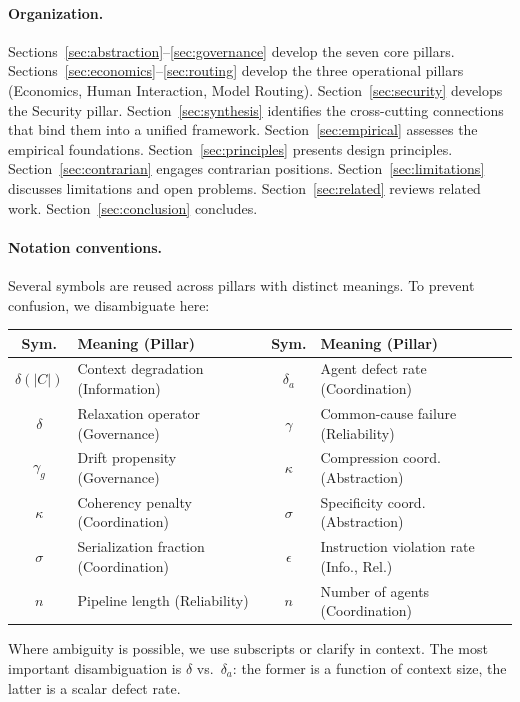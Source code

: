 \documentclass[11pt, a4paper]{googledeepmind}
\begin{document}
\paragraph{Organization.} Sections~\ref{sec:abstraction}--\ref{sec:governance} develop the seven core pillars. Sections~\ref{sec:economics}--\ref{sec:routing} develop the three operational pillars (Economics, Human Interaction, Model Routing). Section~\ref{sec:security} develops the Security pillar. Section~\ref{sec:synthesis} identifies the cross-cutting connections that bind them into a unified framework. Section~\ref{sec:empirical} assesses the empirical foundations. Section~\ref{sec:principles} presents design principles. Section~\ref{sec:contrarian} engages contrarian positions. Section~\ref{sec:limitations} discusses limitations and open problems. Section~\ref{sec:related} reviews related work. Section~\ref{sec:conclusion} concludes.

\paragraph{Notation conventions.} Several symbols are reused across pillars with distinct meanings. To prevent confusion, we disambiguate here:

\begin{center}
\footnotesize
\begin{tabular}{cp{5.5cm}cp{5.5cm}}
\toprule
\textbf{Sym.} & \textbf{Meaning (Pillar)} & \textbf{Sym.} & \textbf{Meaning (Pillar)} \\
\midrule
$\delta(|C|)$ & Context degradation (Information) & $\delta_a$ & Agent defect rate (Coordination) \\
$\delta$ & Relaxation operator (Governance) & $\gamma$ & Common-cause failure (Reliability) \\
$\gamma_g$ & Drift propensity (Governance) & $\kappa$ & Compression coord. (Abstraction) \\
$\kappa$ & Coherency penalty (Coordination) & $\sigma$ & Specificity coord. (Abstraction) \\
$\sigma$ & Serialization fraction (Coordination) & $\epsilon$ & Instruction violation rate (Info., Rel.) \\
$n$ & Pipeline length (Reliability) & $n$ & Number of agents (Coordination) \\
\bottomrule
\end{tabular}
\end{center}
Where ambiguity is possible, we use subscripts or clarify in context. The most important disambiguation is $\delta$ vs.\ $\delta_a$: the former is a function of context size, the latter is a scalar defect rate.
\end{document}
